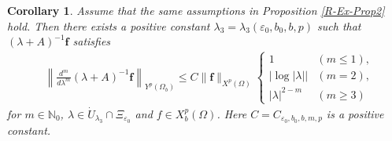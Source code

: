 \documentclass[dvipdfmx,12pt]{article}
\newtheorem{cor}[dfn]{Corollary}
\begin{document}
\begin{cor}\label{R-Ex-Cor1} 
Assume that the same assumptions in Proposition \ref{R-Ex-Prop2} hold. Then there exists a positive constant $\lambda_3=\lambda_3(\varepsilon_0,b_0,b,p)$ such that $(\lambda+A)^{-1}\mathbf{f}$ satisfies
\begin{align}
&\left\| \frac{d^m}{d\lambda^m}(\lambda+A)^{-1}\mathbf{f}\right\|_{Y^p(\Omega_{b})} 
\le C\|\mathbf{f}\|_{X^p(\Omega)}
\begin{cases}
1 & (m\le 1), \\
\left|\log |\lambda|\right| &(m=2), \\
|\lambda|^{2-m} &(m\ge3)
\end{cases}
\label{R-Ex-Cor1-1} 
\end{align}
for $m\in\mathbb{N}_0$, $\lambda\in \Dot{U}_{\lambda_3}\cap \Xi_{\varepsilon_0}$ and $f\in X_b^p(\Omega)$. Here $C=C_{\varepsilon_0,b_0,b,m,p}$  is a positive constant. 
\end{cor}
\end{document}
